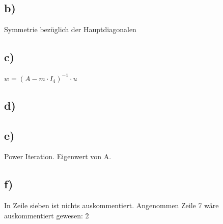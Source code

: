\documentclass[10pt,a4paper]{article}
\begin{document}
\subsection*{b)}
Symmetrie bezüglich der Hauptdiagonalen
\subsection*{c)}
$w = (A - m \cdot I_4)^{-1} \cdot u$
\subsection*{d)}

\subsection*{e)}
Power Iteration.
Eigenwert von A.
\subsection*{f)}
In Zeile sieben ist nichts auskommentiert.
Angenommen Zeile 7 wäre auskommentiert gewesen:
2
\end{document}
